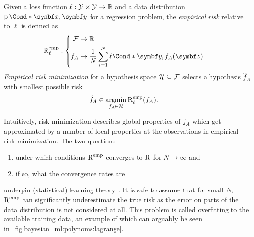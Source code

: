 \begin{definition}
    \label{def:empirical_risk_minimization}
    Given a loss function $\ell: \mathcal{Y} \times \mathcal{Y} \to \mathbb{R}$ and a data distribution $\Prob*{\mat{x}, \mat{y}}$ for a regression problem, the \emph{empirical risk} relative to $\ell$ is defined as
    \begin{align}
        \risk^{\text{emp}}_\ell & : \left\{
        \begin{aligned}
            \Fc & \to \Rb                                                             \\
            f_A & \mapsto \frac{1}{N} \sum_{i=1}^N \Fun*{\ell}{\mat{y}, f_A(\mat{z})}
        \end{aligned}
        \right.
    \end{align}
    \emph{Empirical risk minimization} for a hypothesis space $\mathcal{H} \subseteq \mathcal{F}$ selects a hypothesis $\hat{f}_A$ with smallest possible risk
    \begin{align}
        \hat{f}_A & \in \operatorname*{argmin}_{f_A \in \mathcal{H}} \operatorname{R}^{\text{emp}}_\ell(f_A).
    \end{align}
\end{definition}

Intuitively, risk minimization describes global properties of $f_A$ which get approximated by a number of local properties at the observations in empirical risk minimization.
The two questions
\begin{enumerate}
    \item under which conditions $\operatorname{R}^{\text{emp}}$ converges to $\operatorname{R}$ for $N \to \infty$ and
    \item if so, what the convergence rates are
\end{enumerate}
underpin (statistical) learning theory~\parencite{vapnik_principles_1992}.
It is safe to assume that for small $N$, $\operatorname{R}^{\text{emp}}$ can significantly underestimate the true risk as the error on parts of the data distribution is not considered at all.
This problem is called overfitting to the available training data, an example of which can arguably be seen in~\cref{fig:bayesian_ml:polynoms:lagrange}.


